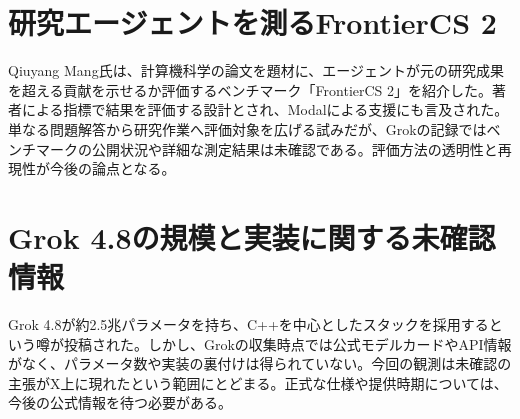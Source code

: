 \section{研究エージェントを測るFrontierCS 2}
Qiuyang Mang氏は、計算機科学の論文を題材に、エージェントが元の研究成果を超える貢献を示せるか評価するベンチマーク「FrontierCS 2」を紹介した。著者による指標で結果を評価する設計とされ、Modalによる支援にも言及された。単なる問題解答から研究作業へ評価対象を広げる試みだが、Grokの記録ではベンチマークの公開状況や詳細な測定結果は未確認である。評価方法の透明性と再現性が今後の論点となる。

\section{Grok 4.8の規模と実装に関する未確認情報}
Grok 4.8が約2.5兆パラメータを持ち、C++を中心としたスタックを採用するという噂が投稿された。しかし、Grokの収集時点では公式モデルカードやAPI情報がなく、パラメータ数や実装の裏付けは得られていない。今回の観測は未確認の主張がX上に現れたという範囲にとどまる。正式な仕様や提供時期については、今後の公式情報を待つ必要がある。
